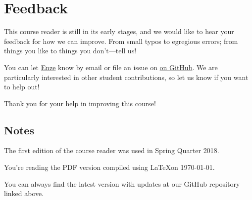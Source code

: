 %

%

\chapter{Feedback} \label{ch:feedback}

This course reader is still in its early stages, and we would like to hear your feedback for how we can improve. 
From small typos to egregious errors; from things you like to things you don't---tell us!

You can let \href{mailto:enze@stanford.edu}{Enze} know by email or file an issue on \href{https://github.com/Enze-Chen/mse_142_cr}{on GitHub}.
We are particularly interested in other student contributions, so let us know if you want to help out!

Thank you for your help in improving this course!

\section{Notes}

The first edition of the course reader was used in Spring Quarter 2018.

You're reading the PDF version compiled using \LaTeX on \today.

You can always find the latest version with updates at our GitHub repository linked above.

%
